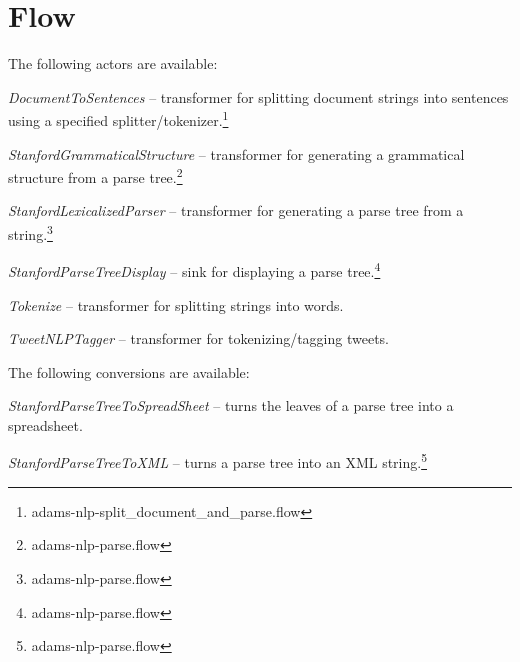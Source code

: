 \documentclass[a4paper]{book}
\begin{document}
\chapter{Flow}
The following actors are available:
\begin{tight_itemize}
	\item \textit{DocumentToSentences} -- transformer for splitting document 
	strings into sentences using a specified
	splitter/tokenizer.\footnote{adams-nlp-split\_document\_and\_parse.flow}
	\item \textit{StanfordGrammaticalStructure} -- transformer for generating a 
	grammatical structure from a parse tree.\footnote{adams-nlp-parse.flow}
	\item \textit{StanfordLexicalizedParser} -- transformer for generating a 
	parse tree from a string.\footnote{adams-nlp-parse.flow}
	\item \textit{StanfordParseTreeDisplay} -- sink for displaying a parse 
	tree.\footnote{adams-nlp-parse.flow}
	\item \textit{Tokenize} -- transformer for splitting strings
	into words.
	\item \textit{TweetNLPTagger} -- transformer for tokenizing/tagging
	tweets.
\end{tight_itemize}
The following conversions are available:
\begin{tight_itemize}
    \item \textit{StanfordParseTreeToSpreadSheet} -- turns the leaves of a
    parse tree into a spreadsheet.
	\item \textit{StanfordParseTreeToXML} -- turns a parse tree into an 
	XML string.\footnote{adams-nlp-parse.flow}
\end{tight_itemize}


\end{document}
